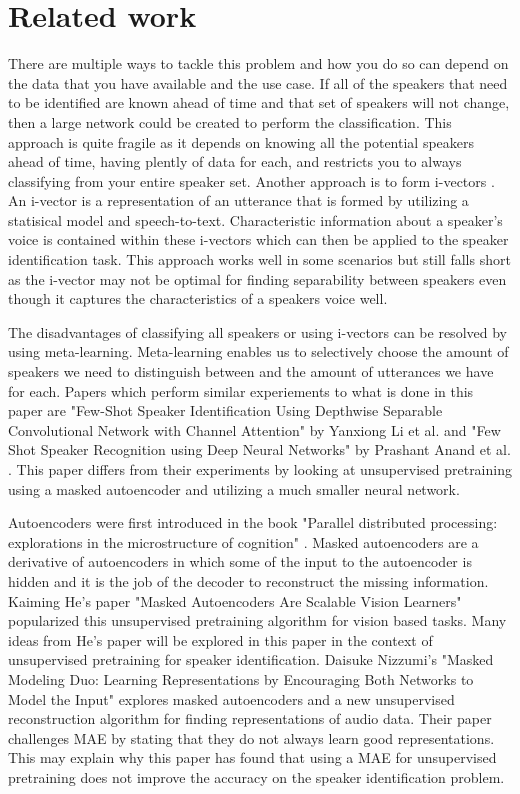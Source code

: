 \documentclass{article}
\begin{document}
\section{Related work}
There are multiple ways to tackle this problem and how you do so can depend on the data that you have available and 
the use case. If all of the speakers that need to be identified are known ahead of time and that set of speakers will 
not change, then a large network could be created to perform the classification. This approach is quite fragile as it 
depends on knowing all the potential speakers ahead of time, having plently of data for each, and restricts you to 
always classifying from your entire speaker set. Another approach is to form i-vectors \cite{ivectors}. An i-vector
is a representation of an utterance that is formed by utilizing a statisical model and speech-to-text. Characteristic 
information about a speaker's voice is contained within these i-vectors which can then be applied to the speaker 
identification task. This approach works well in some scenarios but still falls short as the i-vector may not be optimal
for finding separability between speakers even though it captures the characteristics of a speakers voice well.

The disadvantages of classifying all speakers or using i-vectors can be resolved by using meta-learning. Meta-learning
enables us to selectively choose the amount of speakers we need to distinguish between and the amount of utterances we have
for each. Papers which perform similar experiements to what is done in this paper are "Few-Shot Speaker Identification Using Depthwise
Separable Convolutional Network with Channel Attention" \cite{FewShotSpeakerIDChannelAttention} by Yanxiong Li et al. and
"Few Shot Speaker Recognition using Deep Neural Networks" by Prashant Anand et al. \cite{FewShotSpeakerRecognition}. This paper
differs from their experiments by looking at unsupervised pretraining using a masked autoencoder and utilizing a much smaller
neural network.

Autoencoders were first introduced in the book "Parallel distributed processing: explorations in the microstructure of 
cognition" \cite{ParallelDistributedProcessing}. Masked autoencoders are a derivative of autoencoders in which some of the
input to the autoencoder is hidden and it is the job of the decoder to reconstruct the missing information. Kaiming He's paper
"Masked Autoencoders Are Scalable Vision Learners" \cite{MAE} popularized this unsupervised pretraining algorithm for vision based tasks.
Many ideas from He's paper will be explored in this paper in the context of unsupervised pretraining for speaker identification.
Daisuke Nizzumi's "Masked Modeling Duo: Learning Representations by Encouraging Both Networks to Model 
the Input" \cite{MaskedModelingDuo} explores masked autoencoders and a new unsupervised reconstruction algorithm for finding representations 
of audio data. Their paper challenges MAE by stating that they do not always learn good representations. This may explain 
why this paper has found that using a MAE for unsupervised pretraining does not improve the accuracy on the speaker identification problem.
\end{document}
